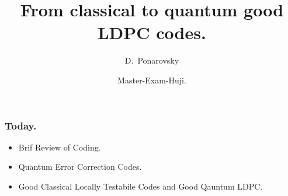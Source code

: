 \documentclass[usenames, aspectratio=169]{beamer}
\title[From classical to quantum good LDPC codes.] %
{From classical to quantum good LDPC codes.}
\subtitle{  }
\author[D.~Ponarovsky] %
	{D.~Ponarovsky\inst{1}}
\institute[HUJI] %
{  Faculty of Computer Science\newline
  Hebrew University of Jerusalem
}
\date[2023] %
{Master-Exam-Huji.}
\newcommand{\pslsq}[4]{
\begin{frame}
    \frametitle{#1} 
    \texttt{[image: \#3]}
    #4  
  \end{frame}
}
\begin{document}



\begin{frame}
  \maketitle
\end{frame}

\begin{frame}
  \frametitle{ Today. }
  \begin{itemize}
    \item<1-> Brif Review of Coding. 
    \item<2-> Quantum Error Correction Codes.
    \item<3->Good Classical Locally Testabile Codes and Good Qauntum LDPC.
  \end{itemize} 
\end{frame}
\end{document}
